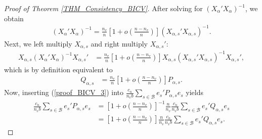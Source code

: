 \documentclass[Research_Module_ES.tex]{subfiles}
\begin{document}
\begin{proof}[Proof of Theorem \ref{THM_Consistency_BICV}]
	After solving for $(X_{\alpha}'X_{\alpha})^{-1}$, we obtain
	\begin{align*}
	(X_{\alpha}'X_{\alpha})^{-1} = \frac{n_v}{n}\left[1+o\left(\frac{n-n_v}{n}\right)\right](X_{\alpha,s}'X_{\alpha,s})^{-1}.
	\end{align*}
	Next, we left multiply $X_{\alpha,s}$ and right multiply $X_{\alpha,s}'$:
	\begin{align*}
	X_{\alpha,s}(X_{\alpha}'X_{\alpha})^{-1}X_{\alpha,s}' &= \frac{n_v}{n}\left[1+o\left(\frac{n-n_v}{n}\right)\right] X_{\alpha,s} (X_{\alpha,s}'X_{\alpha,s})^{-1}X_{\alpha,s}' ,
	\end{align*}
	which is by definition equivalent to
	\begin{align}
	Q_{\alpha,s} &= \frac{n_v}{n}\left[1+o\left(\frac{n-n_v}{n}\right)\right] P_{\alpha,s}.\label{proof_BICV_3}
	\end{align}
	Now, inserting (\ref{proof_BICV_3}) into $\frac{c_n}{n_vb}\sum_{s\in \mathcal{B}}e_s'P_{\alpha,s}e_s$ yields
	\begin{align}
	\frac{c_n}{n_vb}\sum_{s\in \mathcal{B}}e_s'P_{\alpha,s}e_s
	&=\left[1+o\left(\frac{n-n_v}{n}\right)\right]^{-1}\frac{n}{n_v}\frac{c_n}{n_vb}\sum_{s\in \mathcal{B}}e_s'Q_{\alpha,s}e_s\nonumber\\
	&=\left[1+o\left(\frac{n-n_v}{n}\right)\right]\frac{n}{n_v}\frac{c_n}{n_vb}\sum_{s\in \mathcal{B}}e_s'Q_{\alpha,s}e_s. \label{proof_BICV_4}
	\end{align}
	

\end{proof}
\end{document}
